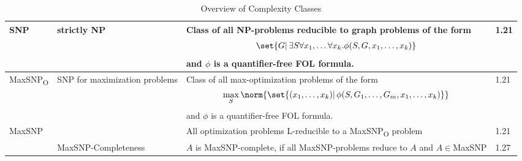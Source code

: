 \documentclass[a4paper, 9pt, landscape]{article}
\begin{document}
\begin{table}[ht!]
\begin{tabular}[ht!]{l | p{7cm}| p{14cm}| l}
    
    SNP & strictly NP & Class of all NP-problems reducible to graph problems of the form
                        \begin{align*}
                          \set{G |\, \exists S \forall x_1, \dots \forall x_k. \phi(S, G, x_1, \dots, x_k)}
                        \end{align*}
                        and $\phi$ is a quantifier-free FOL formula.  & 1.21 \\ \hline
    MaxSNP\textsubscript{O} &SNP for maximization problems & Class of all max-optimization problems of the form
                                                             \begin{align*}
                                                               \max_S\norm{\set{(x_1, \dots, x_k)|\, \phi(S, G_1, \dots, G_m, x_1, \dots, x_k)}}
                                                             \end{align*}
                                                             and $\phi$ is a quantifier-free FOL formula.  & 1.21 \\ \hline
    MaxSNP & & All optimization problems L-reducible to a MaxSNP\textsubscript{O} problem & 1.21 \\ \hline
    &MaxSNP-Completeness & $A$ is MaxSNP-complete, if all MaxSNP-problems reduce to $A$ and $A \in$MaxSNP   &1.27 \\ \hline
  \end{tabular}
  \caption{Overview of Complexity Classes}
  \label{tab:classes}
\end{table}
\end{document}
